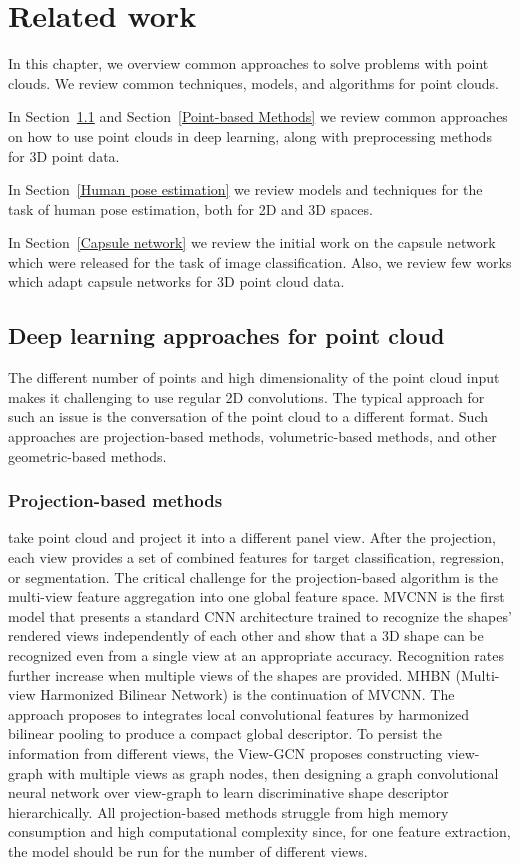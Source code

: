 \chapter{Related work}
\label{Related work}

In this chapter, we overview common approaches to solve problems with point clouds. We review common techniques, models, and algorithms for point clouds.

In Section~\ref{Deep learning approaches for point cloud} and Section~\ref{Point-based Methods} we review common approaches on how to use point clouds in deep learning, along with preprocessing methods for 3D point data.

In Section~\ref{Human pose estimation} we review models and techniques for the task of human pose estimation, both for 2D and 3D spaces.

In Section~\ref{Capsule network} we review the initial work on the capsule network which were released for the task of image classification. Also, we review few works which adapt capsule networks for 3D point cloud data.

\section{Deep learning approaches for point cloud}
\label{Deep learning approaches for point cloud}
The different number of points and high dimensionality of the point cloud input makes it challenging to use regular 2D convolutions. The typical approach for such an issue is the conversation of the point cloud to a different format. Such approaches are projection-based methods, volumetric-based methods, and other geometric-based methods.
\subsection{Projection-based methods} take point cloud and project it into a different panel view. After the projection, each view provides a set of combined features for target classification, regression, or segmentation. The critical challenge for the projection-based algorithm is the multi-view feature aggregation into one global feature space.
MVCNN \parencite{su_multi-view_2015} is the first model that presents a standard CNN architecture trained to recognize the shapes' rendered views independently of each other and show that a 3D shape can be recognized even from a single view at an appropriate accuracy. Recognition rates further increase when multiple views of the shapes are provided.
MHBN \parencite{yu_multi-view_2018} (Multi-view Harmonized Bilinear Network) is the continuation of MVCNN. The approach proposes to integrates local convolutional features by harmonized bilinear pooling to produce a compact global descriptor.
To persist the information from different views, the View-GCN \parencite{wei_view-gcn_2020} proposes constructing view-graph with multiple views as graph nodes, then designing a graph convolutional neural network over view-graph to learn discriminative shape descriptor hierarchically.
All projection-based methods struggle from high memory consumption and high computational complexity since, for one feature extraction, the model should be run for the number of different views.

